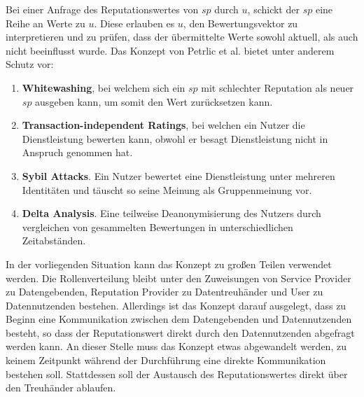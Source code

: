 \documentclass[11pt,a4paper]{scrreprt}
\begin{document}
Bei einer Anfrage des Reputationswertes von $sp$ durch $u$, schickt der $sp$ eine Reihe an Werte zu $u$. Diese erlauben es $u$, den Bewertungsvektor zu interpretieren und zu prüfen, dass der übermittelte Werte sowohl aktuell, als auch nicht beeinflusst wurde. 
Das Konzept von Petrlic et al. bietet unter anderem Schutz vor: 
\begin{enumerate}
    \item \textbf{Whitewashing}, bei welchem sich ein $sp$ mit schlechter Reputation als neuer $sp$ ausgeben kann, um somit den Wert zurücksetzen kann.
    \item \textbf{Transaction-independent Ratings}, bei welchen ein Nutzer die Dienstleistung bewerten kann, obwohl er besagt Dienstleistung nicht in Anspruch genommen hat.
    \item \textbf{Sybil Attacks}. Ein Nutzer bewertet eine Dienstleistung unter mehreren Identitäten und täuscht so seine Meinung als Gruppenmeinung vor.
    \item \textbf{Delta Analysis}. Eine teilweise Deanonymisierung des Nutzers durch vergleichen von gesammelten Bewertungen in unterschiedlichen Zeitabständen.
\end{enumerate} 
In der vorliegenden Situation kann das Konzept zu großen Teilen verwendet werden. Die Rollenverteilung bleibt unter den Zuweisungen von Service Provider zu Datengebenden, Reputation Provider zu Datentreuhänder und User zu Datennutzenden bestehen. Allerdings ist das Konzept darauf ausgelegt, dass zu Beginn eine Kommunikation zwischen dem Datengebenden und Datennutzenden besteht, so dass der Reputationswert direkt durch den Datennutzenden abgefragt werden kann. An dieser Stelle muss das Konzept etwas abgewandelt werden, zu keinem Zeitpunkt während der Durchführung eine direkte Kommunikation bestehen soll. Stattdessen soll der Austausch des Reputationswertes direkt über den Treuhänder ablaufen.
\end{document}
